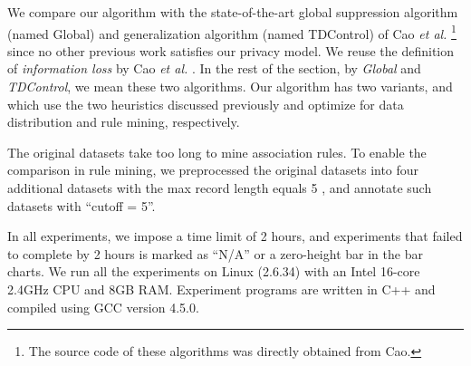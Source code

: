 We compare our algorithm with the state-of-the-art global suppression
algorithm (named Global) and generalization algorithm (named TDControl) of
Cao {\em et al.} \cite{Cao:2010:rho}\footnote{The source code of these
algorithms was directly obtained from Cao.} since no other previous work
satisfies our privacy model. We reuse the definition of {\em information loss}
by Cao {\em et al.} \cite{Cao:2010:rho}. In the rest of the section, by {\em
Global} and {\em TDControl}, we mean these two algorithms. Our algorithm has
two variants, \psdist and \psrule which use the two heuristics discussed
previously and optimize for data distribution and rule mining, respectively.

The original datasets take too long to mine association rules.
 To enable the comparison in rule mining, we preprocessed the
original datasets into four additional datasets with the max record length equals 5
, and annotate such datasets with ``cutoff = 5''.

In all experiments, we impose a time limit of
2 hours, and experiments that failed to complete by 2 hours is marked
as ``N/A'' or a zero-height bar in the bar charts.
We run all the experiments on Linux (2.6.34) with an Intel 16-core 2.4GHz CPU
and 8GB RAM. Experiment programs are written in C++ and compiled using GCC
version 4.5.0.


%
%

